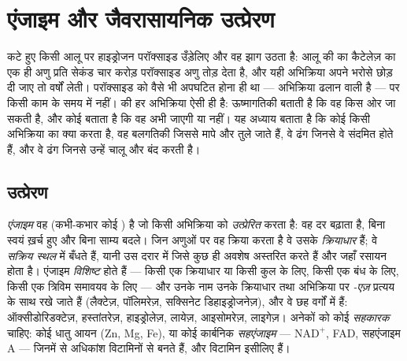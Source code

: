 \chapter{एंजाइम और जैवरासायनिक उत्प्रेरण}\label{ch:b1:enzymes}

कटे हुए किसी आलू पर हाइड्रोजन परॉक्साइड उँड़ेलिए और वह झाग उठता है: आलू
की  का कैटेलेज़ का एक ही अणु प्रति सेकंड चार करोड़ परॉक्साइड अणु
तोड़ देता है, और यही अभिक्रिया अपने भरोसे छोड़ दी जाए तो वर्षों लेती।
परॉक्साइड को वैसे भी अपघटित होना ही था --- अभिक्रिया ढलान वाली है ---
पर किसी काम के समय में नहीं।  की हर अभिक्रिया ऐसी ही है:
ऊष्मागतिकी बताती है कि वह किस ओर जा सकती है, और कोई
\emph{} बताता है कि वह अभी जाएगी या नहीं। यह अध्याय बताता है कि
कोई  किसी अभिक्रिया का क्या करता है, वह बलगतिकी जिससे  मापे
और तुले जाते हैं, वे ढंग जिनसे वे संदमित होते हैं, और वे ढंग जिनसे 
उन्हें चालू और बंद करती है।

\section{उत्प्रेरण}

\begin{definition}[एंजाइम, क्रियाधार, सक्रिय स्थल]\label{def:b1:enzymes:enzyme}
\emph{एंजाइम} वह  (कभी-कभार कोई ) है जो किसी
अभिक्रिया को \emph{उत्प्रेरित} करता है: वह दर बढ़ाता है, बिना स्वयं
ख़र्च हुए और बिना साम्य बदले। जिन अणुओं पर वह क्रिया करता है वे उसके
\emph{क्रियाधार} हैं; वे \emph{सक्रिय
स्थल} में बँधते हैं, यानी उस दरार में जिसे कुछ ही
अवशेष अस्तरित करते हैं और जहाँ रसायन होता है। एंजाइम \emph{विशिष्ट} होते
हैं --- किसी एक क्रियाधार या किसी कुल के लिए, किसी एक बंध के लिए, किसी एक
त्रिविम समावयव के लिए --- और उनके नाम उनके क्रियाधार तथा अभिक्रिया पर
\emph{-एज़} प्रत्यय के साथ रखे जाते हैं (लैक्टेज़,  पॉलिमरेज़,
सक्सिनेट डिहाइड्रोजनेज़), और वे छह वर्गों में हैं: ऑक्सीडोरिडक्टेज़,
हस्तांतरेज़, हाइड्रोलेज़, लायेज़, आइसोमरेज़, लाइगेज़। अनेकों को कोई
 \emph{सहकारक} चाहिए: कोई धातु आयन (Zn, Mg, Fe),
या कोई कार्बनिक \emph{सहएंजाइम}
--- $\mathrm{NAD^+}$, FAD, सहएंजाइम A --- जिनमें से अधिकांश विटामिनों से
बनते हैं, और विटामिन इसीलिए हैं।
\end{definition}

